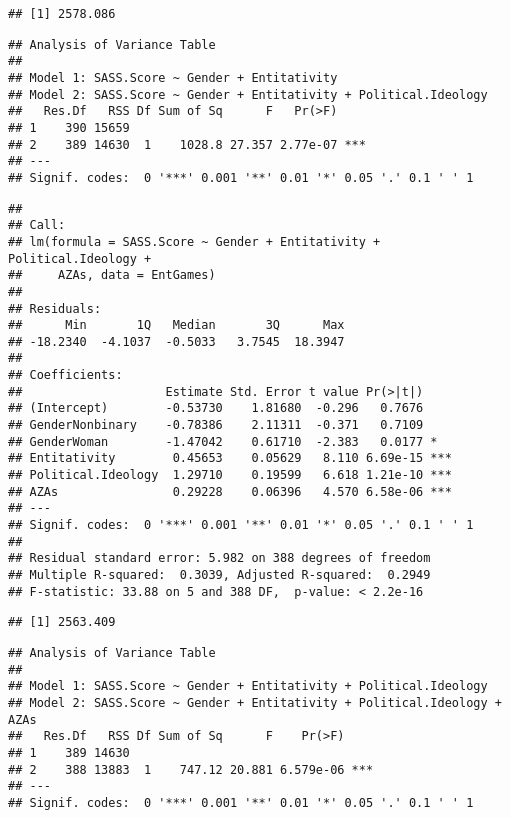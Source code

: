 \documentclass[
  doc,draftall]{apa6}
\begin{document}
\begin{verbatim}
## [1] 2578.086
\end{verbatim}

\begin{verbatim}
## Analysis of Variance Table
## 
## Model 1: SASS.Score ~ Gender + Entitativity
## Model 2: SASS.Score ~ Gender + Entitativity + Political.Ideology
##   Res.Df   RSS Df Sum of Sq      F   Pr(>F)    
## 1    390 15659                                 
## 2    389 14630  1    1028.8 27.357 2.77e-07 ***
## ---
## Signif. codes:  0 '***' 0.001 '**' 0.01 '*' 0.05 '.' 0.1 ' ' 1
\end{verbatim}

\begin{verbatim}
## 
## Call:
## lm(formula = SASS.Score ~ Gender + Entitativity + Political.Ideology + 
##     AZAs, data = EntGames)
## 
## Residuals:
##      Min       1Q   Median       3Q      Max 
## -18.2340  -4.1037  -0.5033   3.7545  18.3947 
## 
## Coefficients:
##                    Estimate Std. Error t value Pr(>|t|)    
## (Intercept)        -0.53730    1.81680  -0.296   0.7676    
## GenderNonbinary    -0.78386    2.11311  -0.371   0.7109    
## GenderWoman        -1.47042    0.61710  -2.383   0.0177 *  
## Entitativity        0.45653    0.05629   8.110 6.69e-15 ***
## Political.Ideology  1.29710    0.19599   6.618 1.21e-10 ***
## AZAs                0.29228    0.06396   4.570 6.58e-06 ***
## ---
## Signif. codes:  0 '***' 0.001 '**' 0.01 '*' 0.05 '.' 0.1 ' ' 1
## 
## Residual standard error: 5.982 on 388 degrees of freedom
## Multiple R-squared:  0.3039, Adjusted R-squared:  0.2949 
## F-statistic: 33.88 on 5 and 388 DF,  p-value: < 2.2e-16
\end{verbatim}

\begin{verbatim}
## [1] 2563.409
\end{verbatim}

\begin{verbatim}
## Analysis of Variance Table
## 
## Model 1: SASS.Score ~ Gender + Entitativity + Political.Ideology
## Model 2: SASS.Score ~ Gender + Entitativity + Political.Ideology + AZAs
##   Res.Df   RSS Df Sum of Sq      F    Pr(>F)    
## 1    389 14630                                  
## 2    388 13883  1    747.12 20.881 6.579e-06 ***
## ---
## Signif. codes:  0 '***' 0.001 '**' 0.01 '*' 0.05 '.' 0.1 ' ' 1
\end{verbatim}
\end{document}
